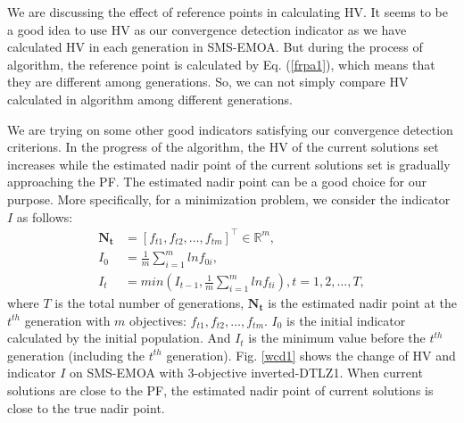 \documentclass[conference]{IEEEtran}
\begin{document}
We are discussing the effect of reference points in calculating HV. It seems to be a good
idea to use HV as our convergence detection indicator as we have calculated 
HV in each generation in SMS-EMOA. 
But during the process of algorithm, the reference point is calculated by Eq. (\ref{frpa1}), 
which means that they are different among generations. 
So, we can not simply compare HV calculated in algorithm among different generations. 

We are trying on some other good indicators satisfying our convergence detection criterions. 
In the progress of the algorithm, the HV of the current solutions set increases 
while the estimated nadir point of the current solutions set is gradually approaching the PF. 
The estimated nadir point can be a good choice for our purpose. 
More specifically,
for a minimization problem, we consider the indicator $I$ as follows:
\begin{equation}\begin{aligned}\label{ewcd1}
  \boldsymbol{N_{t}} &= [f_{t1},f_{t2},\dots,f_{tm}]^\top \in \mathbb{R}^m ,\\
  I_{0} &= \frac{1}{m} \sum_{i=1}^{m}lnf_{0i},\\
  I_{t} &= min(I_{t-1},\frac{1}{m} \sum_{i=1}^{m}lnf_{ti}),
  t = 1,2,\dots,T,
\end{aligned}
\end{equation}
where $T$ is the total number of generations, 
$\boldsymbol{N_{t}}$ is the estimated nadir point at the $t^{th}$ generation with $m$ objectives: $f_{t1},f_{t2},\dots,f_{tm}$. 
$I_0$ is the initial indicator calculated by the initial population.
And $I_t$ is the minimum value before the $t^{th}$ generation (including the $t^{th}$ generation). 
Fig. \ref{wcd1} shows the change of HV and indicator $I$ on SMS-EMOA  
with 3-objective inverted-DTLZ1.
When current solutions are close to the PF, the estimated nadir point of current solutions is close 
to the true nadir point. 
\end{document}

